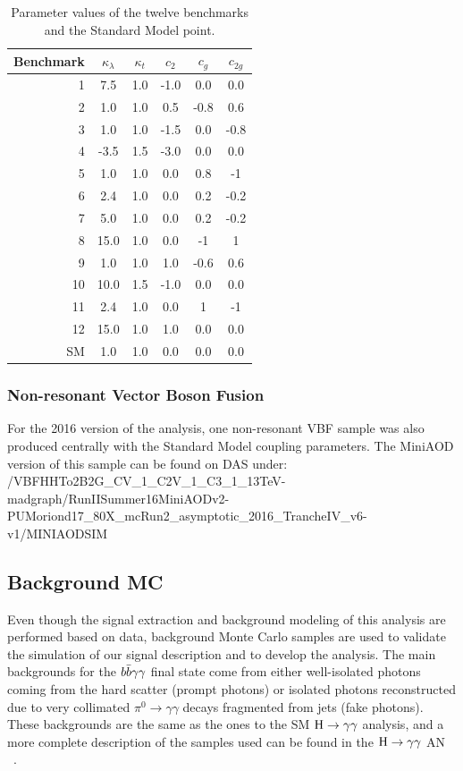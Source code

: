  \begin{table}[h]
\centering
\small{
\begin{tabular}{rccccc}
\hline
Benchmark & $\kappa_{\lambda}$ & $\kappa_{t}$ & $c_{2}$	& $c_{g}$ & $c_{2g}$ \\\hline
1 &	7.5	 & 1.0	 &	-1.0	& 0.0	& 0.0 \\
2 &	1.0	 & 1.0	 &	0.5		& -0.8	& 0.6 \\
3 &	1.0	 & 1.0	 &	-1.5	& 0.0	& -0.8 \\
4 &	-3.5 & 1.5  &	-3.0	& 0.0	& 0.0 \\
5 &	1.0	 & 1.0	 &	0.0		& 0.8	& -1 \\
6 &	2.4	 & 1.0	 &	0.0		& 0.2	& -0.2 \\
7 &	5.0	 & 1.0	 &	0.0		& 0.2	& -0.2 \\
8 &	15.0 & 1.0	 &	0.0		& -1	& 1 \\
9 &	1.0	 & 1.0	 &	1.0		& -0.6	& 0.6 \\
10 &	10.0 & 1.5   &	-1.0	& 0.0	& 0.0 \\
11 &	2.4	 & 1.0	 &	0.0		& 1		& -1 \\
12 &	15.0 & 1.0	 &	1.0		& 0.0	& 0.0 \\ \hline %
SM &	1.0 & 1.0	 &	0.0		& 0.0	& 0.0 \\
\hline
\end{tabular}
}
\caption{\small Parameter values of the twelve benchmarks and the Standard Model point.  \label{tab:bench}}
\end{table}
 
\subsubsection{Non-resonant Vector Boson Fusion}

For the 2016 version of the analysis, one non-resonant VBF sample was also produced centrally with the Standard Model coupling parameters. 
The MiniAOD version of this sample can be found on DAS under:   
/VBFHHTo2B2G\_CV\_1\_C2V\_1\_C3\_1\_13TeV-madgraph/RunIISummer16MiniAODv2-PUMoriond17\_80X\_mcRun2\_asymptotic\_2016\_TrancheIV\_v6-v1/MINIAODSIM
 
\subsection{Background MC}

Even though the signal extraction and background modeling of this analysis are performed based on data, background Monte Carlo samples are used to validate the simulation of our signal description and to develop the analysis. The main backgrounds for the $b\bar{b}\gamma\gamma $ final state come from either well-isolated photons coming from the hard scatter (prompt photons) or isolated photons reconstructed due to very collimated $\pi^{0}\to\gamma\gamma$ decays fragmented from jets (fake photons). These backgrounds are the same as the ones to the SM $\mathrm{H}\to\gamma\gamma$ analysis, and a more complete description of the samples used can be found in the $\mathrm{H}\to\gamma\gamma$ AN ~\cite{Hgg2015, Hgg2016}.

